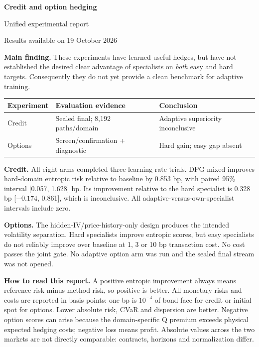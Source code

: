 \documentclass[11pt,a4paper]{article}
\begin{document}
{\Huge\bfseries Credit and option hedging}\par
{\Large Unified experimental report}\par
{\large Results available on 19 October 2026}\par\vspace{5mm}
\textbf{Main finding.} These experiments have learned useful hedges, but have not established the desired clear advantage of specialists on \emph{both} easy and hard targets. Consequently they do not yet provide a clean benchmark for adaptive training.

\begin{center}
\begin{small}
\begin{tabular}{lll}
\toprule
Experiment & Evaluation evidence & Conclusion \\
\midrule
Credit & Sealed final; 8,192 paths/domain & Adaptive superiority inconclusive \\
Options & Screen/confirmation + diagnostic & Hard gain; easy gap absent \\
\bottomrule
\end{tabular}
\end{small}\par\medskip
\end{center}
\textbf{Credit.} All eight arms completed three learning-rate trials. DPG mixed improves hard-domain entropic risk relative to baseline by 0.853 bp, with paired 95\% interval [0.057, 1.628] bp. Its improvement relative to the hard specialist is 0.328 bp [\(-0.174\), 0.861], which is inconclusive. All adaptive-versus-own-specialist intervals include zero.

\textbf{Options.} The hidden-IV/price-history-only design produces the intended volatility separation. Hard specialists improve entropic scores, but easy specialists do not reliably improve over baseline at 1, 3 or 10 bp transaction cost. No cost passes the joint gate. No adaptive option arm was run and the sealed final stream was not opened.

\textbf{How to read this report.} A positive entropic improvement always means reference risk minus method risk, so positive is better. All monetary risks and costs are reported in basis points: one bp is \(10^{-4}\) of bond face for credit or initial spot for options. Lower absolute risk, CVaR and dispersion are better. Negative option scores can arise because the domain-specific Q premium exceeds physical expected hedging costs; negative loss means profit. Absolute values across the two markets are not directly comparable: contracts, horizons and normalization differ.
\end{document}
